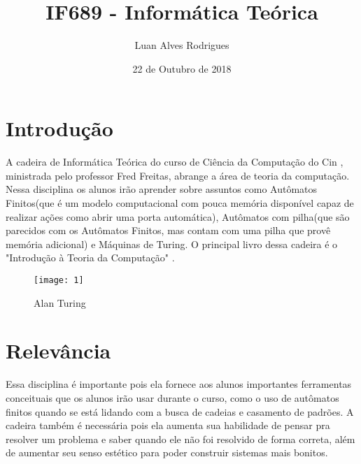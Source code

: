 \documentclass[a4paper,10pt]{extarticle}
\title{IF689 - Informática Teórica}
\author{Luan Alves Rodrigues }
\date{22 de Outubro de 2018}
\begin{document}
\maketitle

\section{Introdução}
A cadeira de Informática Teórica do curso de Ciência da Computação do Cin , ministrada pelo professor Fred Freitas, abrange a área de teoria da computação\citep{CinWiki}\citep{SiteDisciplina}. Nessa disciplina os alunos irão aprender sobre assuntos como Autômatos Finitos(que é um modelo computacional com pouca memória disponível capaz de realizar ações como abrir uma porta automática), Autômatos com pilha(que são parecidos com os Autômatos Finitos, mas contam com uma pilha que provê memória adicional) e Máquinas de Turing. O principal livro dessa cadeira é o "Introdução à Teoria da Computação" \citep{MichaelSipser}.

\begin{figure}[h!]
\centering
\texttt{[image: 1]}
\caption{Alan Turing\citep{Imagem}}
\label{fig:1}
\end{figure}


\section{Relevância}
Essa disciplina é importante pois ela fornece aos alunos importantes ferramentas conceituais que os alunos irão usar durante o curso, como o uso de autômatos finitos quando se está lidando com a busca de cadeias e casamento de padrões. A cadeira também é necessária pois ela aumenta sua habilidade de pensar pra resolver um problema e saber quando ele não foi resolvido de forma correta, além de aumentar seu senso estético para poder construir sistemas mais bonitos.
\end{document}
